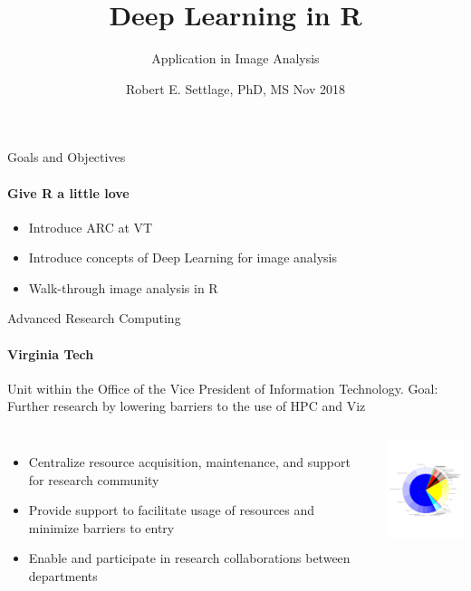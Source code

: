 \documentclass{beamer}
\title{Deep Learning in R} %
\subtitle{Application in Image Analysis} %
\author{Robert E. Settlage, PhD, MS \newline Nov 2018}
\begin{document}
  \frame{\maketitle}
  \begin{darkframes}
    \small
    \begin{frame}[label=lists]{Goals and Objectives}
    \framesubtitle{Give R a little love}
      \begin{itemize}
          \item Introduce ARC at VT
          \item Introduce concepts of Deep Learning for image analysis
          \item Walk-through image analysis in R
      \end{itemize}
          
    \end{frame}

    \begin{frame}{Advanced Research Computing}
      \framesubtitle{Virginia Tech}
      \begin{block}
      {\small{Unit within the Office of the Vice President of Information Technology.}}
      Goal: Further research by lowering barriers to the use of HPC and Viz
      \end{block}
      \begin{columns}[onlytextwidth]
      \begin{itemize}
          \item Centralize resource acquisition, maintenance, and support for research community
          \item Provide support to facilitate usage of resources and minimize barriers to entry
          \item Enable and participate in research collaborations between departments
      \end{itemize}
      \includegraphics[width=3cm]{College_usage.pdf}
      \end{columns}
    \end{frame}
    

\end{darkframes}
\end{document}

